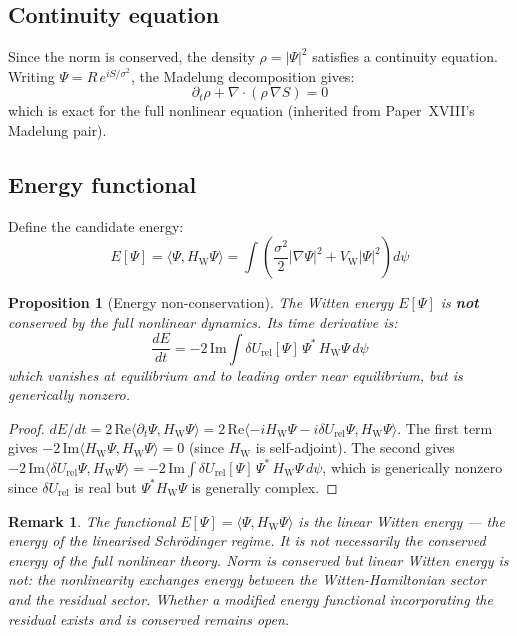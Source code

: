 \documentclass[12pt]{article}
\newtheorem{proposition}[theorem]{Proposition}
\newtheorem{remark}[theorem]{Remark}
\newcommand{\VW}{V_{\mathrm{W}}}
\newcommand{\HW}{H_{\mathrm{W}}}
\newcommand{\dUrel}{\delta U_{\mathrm{rel}}}
\begin{document}
\subsection*{Continuity equation}

Since the norm is conserved, the density $\rho = |\Psi|^2$ satisfies a continuity equation. Writing $\Psi = R\,e^{iS/\sigma^2}$, the Madelung decomposition gives:
\begin{equation}
    \partial_t\rho + \nabla\cdot(\rho\,\nabla S) = 0
\end{equation}
which is exact for the full nonlinear equation (inherited from Paper~XVIII's Madelung pair).

\subsection*{Energy functional}

Define the candidate energy:
\begin{equation}\label{eq:energy}
    E[\Psi] = \langle\Psi, \HW\Psi\rangle = \int\left(\frac{\sigma^2}{2}|\nabla\Psi|^2 + \VW|\Psi|^2\right)d\psi
\end{equation}

\begin{proposition}[Energy non-conservation]\label{prop:energy}
The Witten energy $E[\Psi]$ is \textbf{not} conserved by the full nonlinear dynamics. Its time derivative is:
\begin{equation}
    \frac{dE}{dt} = -2\,\mathrm{Im}\int\dUrel[\Psi]\,\Psi^*\,\HW\Psi\,d\psi
\end{equation}
which vanishes at equilibrium and to leading order near equilibrium, but is generically nonzero.
\end{proposition}

\begin{proof}
$dE/dt = 2\,\mathrm{Re}\langle\partial_t\Psi, \HW\Psi\rangle = 2\,\mathrm{Re}\langle -i\HW\Psi - i\dUrel\Psi, \HW\Psi\rangle$. The first term gives $-2\,\mathrm{Im}\langle\HW\Psi, \HW\Psi\rangle = 0$ (since $\HW$ is self-adjoint). The second gives $-2\,\mathrm{Im}\langle\dUrel\Psi, \HW\Psi\rangle = -2\,\mathrm{Im}\int\dUrel[\Psi]\,\Psi^*\,\HW\Psi\,d\psi$, which is generically nonzero since $\dUrel$ is real but $\Psi^*\HW\Psi$ is generally complex.
\end{proof}

\begin{remark}
The functional $E[\Psi] = \langle\Psi, \HW\Psi\rangle$ is the \textit{linear} Witten energy --- the energy of the linearised Schr\"odinger regime. It is not necessarily the conserved energy of the full nonlinear theory. Norm is conserved but linear Witten energy is not: the nonlinearity exchanges energy between the Witten-Hamiltonian sector and the residual sector. Whether a modified energy functional incorporating the residual exists and is conserved remains open.
\end{remark}
\end{document}
